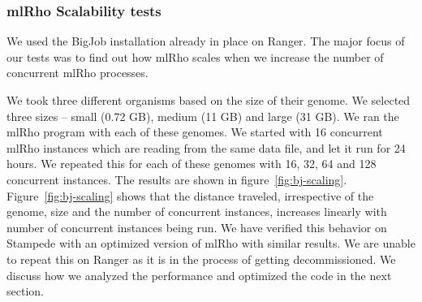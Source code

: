 \documentclass{sig-alternate}
\begin{document}
\subsubsection{mlRho Scalability tests}
\label{sec:scalability}
We used the BigJob installation already in place on Ranger. The major focus of our tests was to find out how mlRho scales when we increase the number of concurrent mlRho processes. 

We took three different organisms based on the size of their genome. We selected three sizes -- small (0.72 GB), medium (11 GB) and large (31 GB). We ran the mlRho program with each of these genomes. We started with 16 concurrent mlRho instances which are reading from the same data file, and let it run for 24 hours. We repeated this for each of these genomes with 16, 32, 64 and 128 concurrent instances. The results are shown in figure~\ref{fig:bj-scaling}. Figure~\ref{fig:bj-scaling} shows that the distance traveled, irrespective of the genome, size and the number of concurrent instances, increases linearly with number of concurrent instances being run. We have verified this behavior on Stampede with an optimized version of mlRho with similar results. We are unable to repeat this on Ranger as it is in the process of getting decommissioned. We discuss how we analyzed the performance and optimized the code in the next section. 
\end{document}
